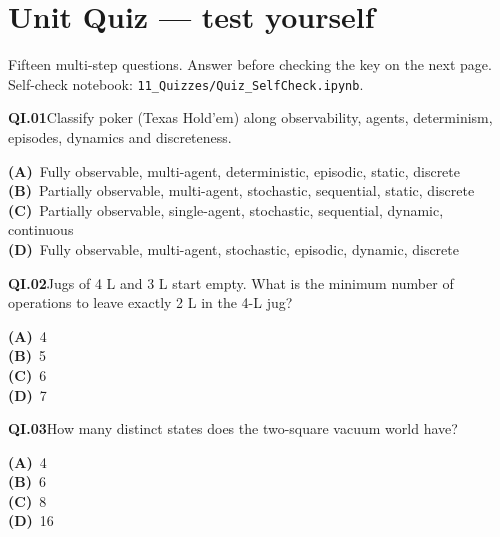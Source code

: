 \section{Unit Quiz --- test yourself}
{\small\color{slate}Fifteen multi-step questions. Answer before checking the key on the next page. Self-check notebook: \texttt{11\_Quizzes/Quiz\_SelfCheck.ipynb}.}\par\medskip
\begin{tcolorbox}[enhanced,breakable,colback=white,colframe=navyL,arc=2mm,boxrule=0.7pt,left=3mm,right=3mm,top=2mm,bottom=2mm]
\textbf{\color{navy}QI.01}\quad Classify poker (Texas Hold'em) along observability, agents, determinism, episodes, dynamics and discreteness.\hfill{}\par\smallskip
{\small \textbf{\color{navyL}(A)}\ Fully observable, multi-agent, deterministic, episodic, static, discrete\\[1pt]\textbf{\color{navyL}(B)}\ Partially observable, multi-agent, stochastic, sequential, static, discrete\\[1pt]\textbf{\color{navyL}(C)}\ Partially observable, single-agent, stochastic, sequential, dynamic, continuous\\[1pt]\textbf{\color{navyL}(D)}\ Fully observable, multi-agent, stochastic, episodic, dynamic, discrete}
\end{tcolorbox}
\begin{tcolorbox}[enhanced,breakable,colback=white,colframe=navyL,arc=2mm,boxrule=0.7pt,left=3mm,right=3mm,top=2mm,bottom=2mm]
\textbf{\color{navy}QI.02}\quad Jugs of 4 L and 3 L start empty. What is the minimum number of operations to leave exactly 2 L in the 4-L jug?\hfill{}\par\smallskip
{\small \textbf{\color{navyL}(A)}\ 4\\[1pt]\textbf{\color{navyL}(B)}\ 5\\[1pt]\textbf{\color{navyL}(C)}\ 6\\[1pt]\textbf{\color{navyL}(D)}\ 7}
\end{tcolorbox}
\begin{tcolorbox}[enhanced,breakable,colback=white,colframe=navyL,arc=2mm,boxrule=0.7pt,left=3mm,right=3mm,top=2mm,bottom=2mm]
\textbf{\color{navy}QI.03}\quad How many distinct states does the two-square vacuum world have?\hfill{}\par\smallskip
{\small \textbf{\color{navyL}(A)}\ 4\\[1pt]\textbf{\color{navyL}(B)}\ 6\\[1pt]\textbf{\color{navyL}(C)}\ 8\\[1pt]\textbf{\color{navyL}(D)}\ 16}
\end{tcolorbox}

